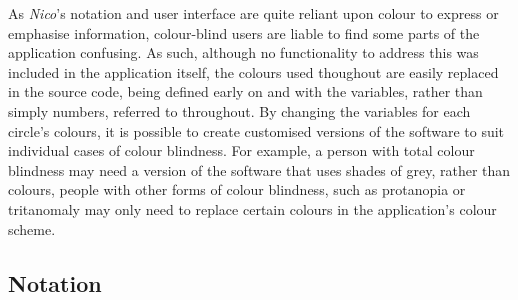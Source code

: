 \documentclass[12pt,twoside,notitlepage,xetex]{report}
\begin{document}
{As \emph{Nico}'s notation and user interface are quite reliant upon colour to express or emphasise information, colour-blind users are liable to find some parts of the application confusing.  As such, although no functionality to address this was included in the application itself, the colours used thoughout are easily replaced in the source code, being defined early on and with the variables, rather than simply numbers, referred to throughout.  By changing the variables for each circle's colours, it is possible to create customised versions of the software to suit individual cases of colour blindness.  For example, a person with total colour blindness may need a version of the software that uses shades of grey, rather than colours, people with other forms of colour blindness, such as protanopia or tritanomaly may only need to replace certain colours in the application's colour scheme.%

\subsection{Notation}%

}
\end{document}

